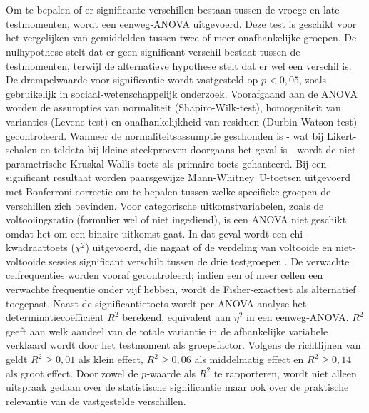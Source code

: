 \section{}
Om te bepalen of er significante verschillen bestaan tussen de vroege en late testmomenten, wordt een eenweg‑ANOVA uitgevoerd. Deze test is geschikt voor het vergelijken van gemiddelden tussen twee of meer onafhankelijke groepen. De nulhypothese stelt dat er geen significant verschil bestaat tussen de testmomenten, terwijl de alternatieve hypothese stelt dat er wel een verschil is. De drempelwaarde voor significantie wordt vastgesteld op $p < 0{,}05$, zoals gebruikelijk in sociaal‑wetenschappelijk onderzoek.
Voorafgaand aan de ANOVA worden de assumpties van normaliteit (Shapiro-Wilk-test), homogeniteit van varianties (Levene-test) en onafhankelijkheid van residuen (Durbin-Watson-test) gecontroleerd. Wanneer de normaliteitsassumptie geschonden is - wat bij Likert-schalen en teldata bij kleine steekproeven doorgaans het geval is \autocite{SauroLewis2016} - wordt de niet-parametrische Kruskal-Wallis-toets als primaire toets gehanteerd. Bij een significant resultaat worden paarsgewijze Mann-Whitney~U-toetsen uitgevoerd met Bonferroni-correctie om te bepalen tussen welke specifieke groepen de verschillen zich bevinden.
Voor categorische uitkomstvariabelen, zoals de voltooiingsratio (formulier wel of niet ingediend), is een ANOVA niet geschikt omdat het om een binaire uitkomst gaat. In dat geval wordt een chi-kwadraattoets ($\chi^2$) uitgevoerd, die nagaat of de verdeling van voltooide en niet-voltooide sessies significant verschilt tussen de drie testgroepen \autocite{Field2018}. De verwachte celfrequenties worden vooraf gecontroleerd; indien een of meer cellen een verwachte frequentie onder vijf hebben, wordt de Fisher-exacttest als alternatief toegepast.
Naast de significantietoets wordt per ANOVA‑analyse het determinatiecoëfficiënt $R^2$ berekend, equivalent aan $\eta^2$ in een eenweg‑ANOVA. $R^2$ geeft aan welk aandeel van de totale variantie in de afhankelijke variabele verklaard wordt door het testmoment als groepsfactor. Volgens de richtlijnen van \textcite{Cohen1988} geldt $R^2 \geq 0{,}01$ als klein effect, $R^2 \geq 0{,}06$ als middelmatig effect en $R^2 \geq 0{,}14$ als groot effect. Door zowel de $p$‑waarde als $R^2$ te rapporteren, wordt niet alleen uitspraak gedaan over de statistische significantie maar ook over de praktische relevantie van de vastgestelde verschillen.

